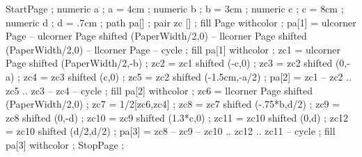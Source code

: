 StartPage ;
numeric a ; a = 4cm ;
numeric b ; b = 3cm ;
numeric c ; c = 8cm ;
numeric d ; d = .7cm ;
path pa[] ;
pair zc [] ;
fill Page withcolor  ;
pa[1] = ulcorner Page -- ulcorner Page shifted (PaperWidth/2,0) -- llcorner Page shifted (PaperWidth/2,0) -- llcorner Page -- cycle ;
fill pa[1] withcolor  ;
zc1 = ulcorner Page shifted (PaperWidth/2,-b) ;
zc2 = zc1 shifted (-c,0) ;
zc3 = zc2 shifted (0,-a) ;
zc4 = zc3 shifted (c,0) ;
zc5 = zc2 shifted (-1.5cm,-a/2) ;
pa[2] = zc1 -- zc2 .. zc5 .. zc3 -- zc4 -- cycle ;
fill pa[2] withcolor  ;
zc6 = llcorner Page shifted (PaperWidth/2,0) ;
zc7 = 1/2[zc6,zc4] ;
zc8 = zc7 shifted (-.75*b,d/2) ;
zc9 = zc8 shifted (0,-d) ;
zc10 = zc9 shifted (1.3*c,0) ;
zc11 = zc10 shifted (0,d) ;
zc12 = zc10 shifted (d/2,d/2) ;
pa[3] = zc8 -- zc9 -- zc10 .. zc12 .. zc11 -- cycle ;
fill pa[3] withcolor  ;
StopPage ;
\stopuniqueMPgraphic






\setupcombinations[distance=1.1cm]


\lecback{\setuplayout[header=5.3cm]\setupbackgrounds[page][background={picbackground,lecbackground,slidetitle}]}
\titback{\setuplayout[header=2.3cm]\setupbackgrounds[page][background={titlebackground,prestitle,presauthor}]}
\picback{\setuplayout[header=2.3cm]\setupbackgrounds[page][background=picbackground]}
\noback{\setupbackgrounds[page][background=nobackground]}

\setupbackgrounds[page][background=lecbackground] 


\setupitemize[1][inmargin][color=c]

\protect
\stopmodule

\endinput

